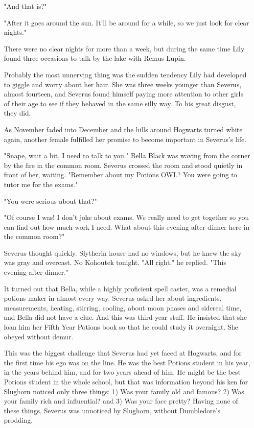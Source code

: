"And that is{\el}?"

"After it goes around the sun. It'll be around for a while, so we just look for clear nights."

There were no clear nights for more than a week, but during the same time Lily found three occasions to talk by the lake with Remus Lupin.

Probably the most unnerving thing was the sudden tendency Lily had developed to giggle and worry about her hair. She was three weeks younger than Severus, almost fourteen, and Severus found himself paying more attention to other girls of their age to see if they behaved in the same silly way. To his great disgust, they did.

As November faded into December and the hills around Hogwarts turned white again, another female fulfilled her promise to become important in Severus's life.

"Snape, wait a bit, I need to talk to you." Bella Black was waving from the corner by the fire in the common room. Severus crossed the room and stood quietly in front of her, waiting. "Remember about my Potions OWL? You were going to tutor me for the exams."

"You were serious about that?"

"Of course I was! I don't joke about exams. We really need to get together so you can find out how much work I need. What about this evening after dinner here in the common room?"

Severus thought quickly. Slytherin house had no windows, but he knew the sky was gray and overcast. No Kohoutek tonight. "All right," he replied. "This evening after dinner."

It turned out that Bella, while a highly proficient spell caster, was a remedial potions maker in almost every way. Severus asked her about ingredients, measurements, heating, stirring, cooling, about moon phases and sidereal time, and Bella did not have a clue. And this was third year stuff. He insisted that she loan him her Fifth Year Potions book so that he could study it overnight. She obeyed without demur.

This was the biggest challenge that Severus had yet faced at Hogwarts, and for the first time his ego was on the line. He was the best Potions student in his year, in the years behind him, and for two years ahead of him. He might be the best Potions student in the whole school, but that was information beyond his ken for Slughorn noticed only three things: 1) Was your family old and famous? 2) Was your family rich and influential? and 3) Was your face pretty? Having none of these things, Severus was unnoticed by Slughorn, without Dumbledore's prodding.

